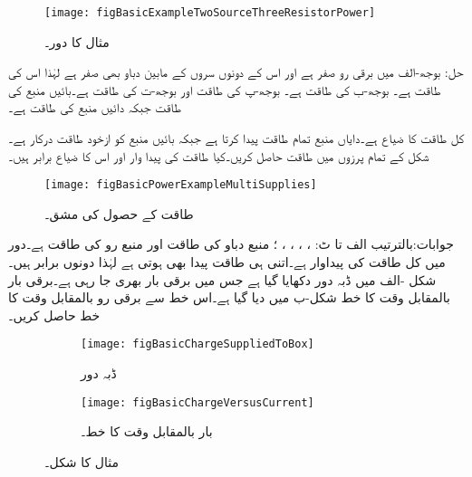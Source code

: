 \begin{figure}
\centering
\texttt{[image: figBasicExampleTwoSourceThreeResistorPower]}
\caption{مثال  کا دور۔}
\label{شکل_بنیادی_طاقت_حساب_مثال}
\end{figure}

حل: بوجھ-الف میں برقی رو صفر ہے اور اس کے دونوں سروں کے مابین دباو بھی صفر ہے لہٰذا اس کی طاقت  ہے۔ بوجھ-ب کی  طاقت  ہے۔ بوجھ-پ کی طاقت  اور بوجھ-ت کی طاقت  ہے۔بائیں منبع کی طاقت  جبکہ دائیں منبع کی طاقت  ہے۔

کل طاقت کا ضیاع   ہے۔دایاں منبع تمام طاقت پیدا کرتا ہے جبکہ بائیں منبع  کو ازخود طاقت درکار ہے۔ 
شکل  کے تمام پرزوں میں طاقت حاصل کریں۔کیا طاقت کی پیدا وار اور اس کا ضیاع برابر ہیں۔

\begin{figure}
\centering
\texttt{[image: figBasicPowerExampleMultiSupplies]}
\caption{طاقت کے حصول کی مشق۔}
\label{شکل_بنیادی_طاقت_حصول_مشق}
\end{figure}

جوابات:بالترتیب الف تا ٹ: ، ، ، ، ؛ منبع دباو کی طاقت  اور منبع رو کی طاقت  ہے۔دور میں کل طاقت کی پیداوار  ہے۔اتنی ہی طاقت پیدا بھی ہوتی ہے لہٰذا دونوں برابر ہیں۔
شکل -الف میں ڈبہ دور دکھایا گیا ہے جس میں برقی بار بھری جا رہی ہے۔برقی بار بالمقابل وقت کا خط شکل-ب میں دیا گیا ہے۔اس خط سے برقی رو بالمقابل وقت کا خط حاصل کریں۔

\begin{figure}
\centering
\begin{subfigure}{1\textwidth}
\centering
\texttt{[image: figBasicChargeSuppliedToBox]}
\caption{ڈبہ دور}
\end{subfigure}
%
\begin{subfigure}{1\textwidth}
\centering
\texttt{[image: figBasicChargeVersusCurrent]}
\caption{بار بالمقابل وقت کا خط۔}
\end{subfigure}
\caption{مثال  کا شکل۔}
\label{شکل_بنیادی_بار_بالمقابل_وقت}
\end{figure}

